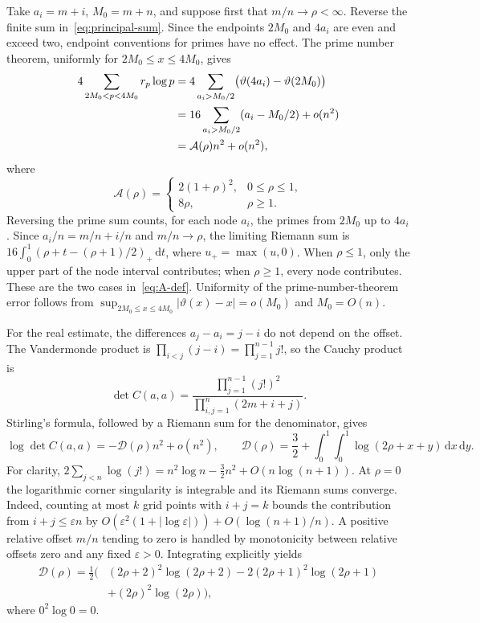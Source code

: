 \documentclass[11pt]{article}
\theoremstyle{definition}
\theoremstyle{remark}
\numberwithin{equation}{section}
\newcommand{\dd}{\,\mathrm d}
\begin{document}
Take $a_i=m+i$, $M_0=m+n$, and suppose first that $m/n\to\rho<\infty$.
Reverse the finite sum in~\eqref{eq:principal-sum}. Since the endpoints
$2M_0$ and $4a_i$ are even and exceed two, endpoint conventions for primes
have no effect. The prime number theorem, uniformly for
$2M_0\leq x\leq4M_0$, gives
\begin{align}
 4\sum_{2M_0<p<4M_0}r_p\log p
 &=4\sum_{a_i>M_0/2}
       \bigl(\vartheta(4a_i)-\vartheta(2M_0)\bigr)\notag\\
 &=16\sum_{a_i>M_0/2}(a_i-M_0/2)+o(n^2)\notag\\
 &=\mathcal A(\rho)n^2+o(n^2),\label{eq:A-rho}
\end{align}
where
\begin{equation}\label{eq:A-def}
 \mathcal A(\rho)=
 \begin{cases}2(1+\rho)^2,&0\leq\rho\leq1,\\8\rho,&\rho\geq1.
 \end{cases}
\end{equation}
Reversing the prime sum counts, for each node $a_i$, the primes from
$2M_0$ up to $4a_i$. Since $a_i/n=m/n+i/n$ and $m/n\to\rho$,
the limiting Riemann sum is
$16\int_0^1(\rho+t-(\rho+1)/2)_+\dd t$, where
$u_+=\max(u,0)$. When $\rho\leq1$, only the upper part of the node
interval contributes; when $\rho\geq1$, every node contributes.
These are the two cases in~\eqref{eq:A-def}.
Uniformity of the prime-number-theorem error follows from
$\sup_{2M_0\leq x\leq4M_0}|\vartheta(x)-x|=o(M_0)$ and
$M_0=O(n)$.

For the real estimate, the differences $a_j-a_i=j-i$ do not depend
on the offset. The Vandermonde product is
$\prod_{i<j}(j-i)=\prod_{j=1}^{n-1}j!$, so the Cauchy product is
\begin{equation}\label{eq:C-shift}
 \det C(a,a)=\frac{\prod_{j=1}^{n-1}(j!)^2}
                    {\prod_{i,j=1}^n(2m+i+j)}.
\end{equation}
Stirling's formula, followed by a Riemann sum for the denominator, gives
\begin{equation}\label{eq:D-rho}
 \log\det C(a,a)=-\mathcal D(\rho)n^2+o(n^2),\qquad
 \mathcal D(\rho)=\frac32+\int_0^1\int_0^1\log(2\rho+x+y)\dd x\dd y.
\end{equation}
For clarity,
$2\sum_{j<n}\log(j!)=n^2\log n-\frac32n^2+O(n\log(n+1))$.
At $\rho=0$ the logarithmic corner singularity is integrable and its
Riemann sums converge. Indeed, counting at most $k$ grid points with
$i+j=k$ bounds the contribution from $i+j\leq\varepsilon n$ by
$O(\varepsilon^2(1+|\log\varepsilon|))+O(\log(n+1)/n)$.
A positive relative offset $m/n$ tending to zero is handled by
monotonicity between relative offsets zero and any fixed $\varepsilon>0$.
Integrating explicitly yields
\begin{equation}\label{eq:D-explicit}
 \begin{split}
 \mathcal D(\rho)=\frac12\bigl(& (2\rho+2)^2\log(2\rho+2)
 -2(2\rho+1)^2\log(2\rho+1)\\
 &+(2\rho)^2\log(2\rho)\bigr),
 \end{split}
\end{equation}
where $0^2\log0=0$.
\end{document}
